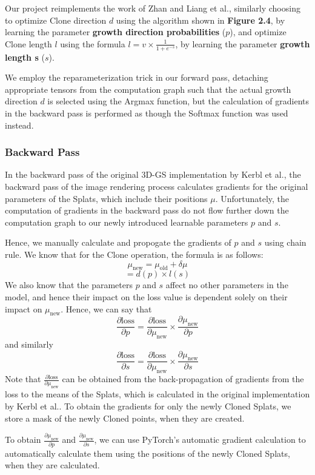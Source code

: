 \documentclass[11pt]{report}
\begin{document}
Our project reimplements the work of Zhan and Liang et al., similarly choosing to optimize Clone direction $d$ using the algorithm shown in \textbf{Figure 2.4}, by learning the parameter \textbf{growth direction probabilities} ($p$), and optimize Clone length $l$ using the formula $l = v \times \frac{1}{1 + e^{-s}}$, by learning the parameter \textbf{growth length s} ($s$).

We employ the reparameterization trick in our forward pass, detaching appropriate tensors from the computation graph such that the actual growth direction $d$ is selected using the Argmax function, but the calculation of gradients in the backward pass is performed as though the Softmax function was used instead.

\subsubsection{Backward Pass}
In the backward pass of the original 3D-GS implementation by Kerbl et al., the backward pass of the image rendering process calculates gradients for the original parameters of the Splats, which include their positions $\mu$. Unfortunately, the computation of gradients in the backward pass do not flow further down the computation graph to our newly introduced learnable parameters $p$ and $s$.

Hence, we manually calculate and propogate the gradients of $p$ and $s$ using chain rule. We know that for the Clone operation, the formula is as follows:
\[ \mu_{\text{new}} = \mu_{\text{old}} + \delta \mu  \]
\[ = d(p) \times l(s) \]
We also know that the parameters $p$ and $s$ affect no other parameters in the model, and hence their impact on the loss value is dependent solely on their impact on \(\mu_{\text{new}}\). Hence, we can say that
\[ \frac{\partial \text{loss}}{\partial p} = \frac{\partial \text{loss}}{\partial \mu_{\text{new}}} \times \frac{\partial \mu_{\text{new}}}{\partial p} \]
and similarly
\[ \frac{\partial \text{loss}}{\partial s} = \frac{\partial \text{loss}}{\partial \mu_{\text{new}}} \times \frac{\partial \mu_{\text{new}}}{\partial s} \]
Note that $\frac{\partial \text{loss}}{\partial \mu_{\text{new}}}$ can be obtained from the back-propagation of gradients from the loss to the means of the Splats, which is calculated in the original implementation by Kerbl et al.. To obtain the gradients for only the newly Cloned Splats, we store a mask of the newly Cloned points, when they are created.

To obtain $\frac{\partial \mu_{\text{new}}}{\partial p}$ and $\frac{\partial \mu_{\text{new}}}{\partial s}$, we can use PyTorch's automatic gradient calculation to automatically calculate them using the positions of the newly Cloned Splats, when they are calculated.
\end{document}
